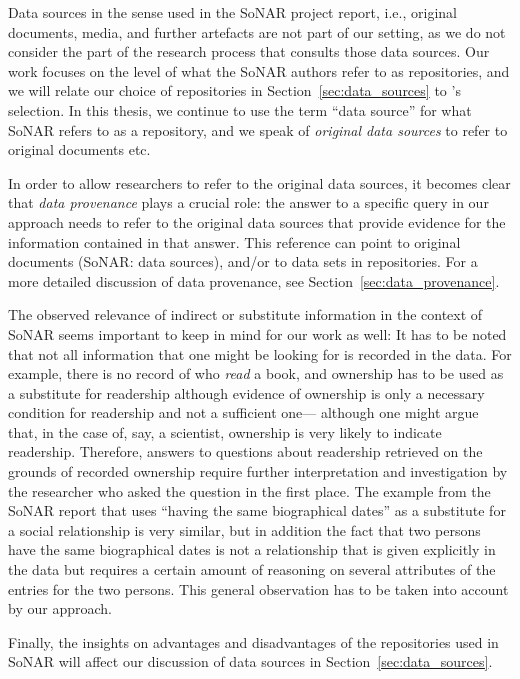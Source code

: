 Data sources in the sense used in the \gls{SoNAR} project report,
i.e., original documents, media, and further artefacts
are not part of our setting, as we do not consider the part of the research process
that consults those data sources. Our work focuses on the level of
what the \gls{SoNAR} authors refer to as repositories,
and we will relate our choice of repositories in Section~\ref{sec:data_sources}
to \citeauthor*{Menzel2020}'s \autocite*{Menzel2020} selection.
In this thesis, we continue to use the term \enquote{data source} for what
\gls{SoNAR} refers to as a repository,
and we speak of \emph{original data sources} to refer to original documents etc.

In order to allow researchers to refer to the original data sources,
it becomes clear that \emph{data provenance} plays a crucial role:
the answer to a specific query in our approach needs to refer to
the original data sources that provide evidence for the information contained in that answer.
This reference can point to original documents (\gls{SoNAR}: data sources),
and/or to data sets in repositories. For a more detailed discussion of data provenance,
see Section~\ref{sec:data_provenance}.

The observed relevance of indirect or substitute information in the context of \gls{SoNAR} 
seems important to keep in mind for our work as well: 
It has to be noted that not all information that one might be looking for is recorded
in the data. For example, there is no record of who \emph{read} a book,
and ownership has to be used as a substitute for readership although evidence
of ownership is only a necessary condition for readership and not a sufficient one---%
although one might argue that, in the case of, say, a scientist, ownership is very likely
to indicate readership.
Therefore, answers to questions
about readership retrieved on the grounds of recorded ownership require further interpretation and investigation
by the researcher who asked the question in the first place.
The example from the \gls{SoNAR} report that uses \enquote{having the same biographical dates}
as a substitute for a social relationship is very similar, but in addition
the fact that two persons have the same biographical dates is not a relationship that is
given explicitly in the data but requires a certain amount of reasoning on several attributes of the entries
for the two persons.
This general observation has to be taken into account by our approach.

Finally, the insights on advantages and disadvantages of the repositories used in \gls{SoNAR}
will affect our discussion of data sources in Section~\ref{sec:data_sources}.

